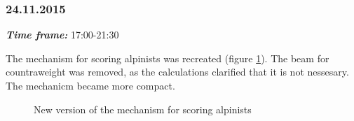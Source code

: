 \subsubsection{24.11.2015}
\textit{\textbf{Time frame:}} 17:00-21:30

The mechanism for scoring alpinists was recreated (figure \ref{Alpinists0.4}). The beam for countraweight was removed, as the calculations clarified that it is not nessesary. The mechanicm became more compact.

\begin{figure}[H]
	\begin{minipage}[h]{1\linewidth}
		\caption{New version of the mechanism for scoring alpinists}
		\label{Alpinists0.4}
	\end{minipage}
\end{figure}

